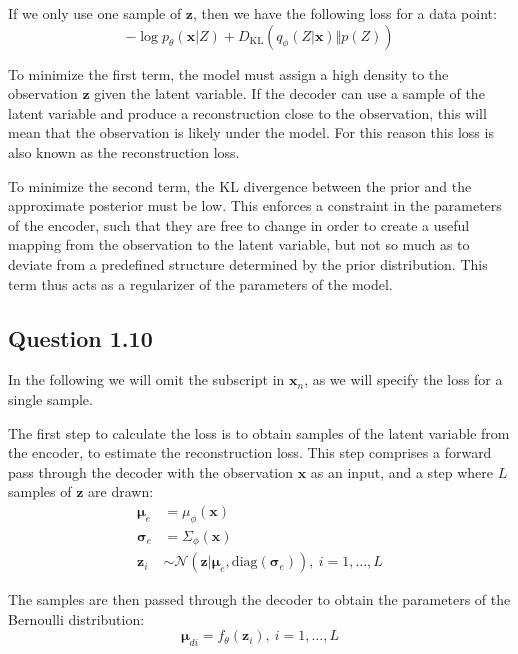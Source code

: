 \documentclass{article}
\begin{document}
If we only use one sample of $\mathbf{z}$, then we have the following loss for a data point: 
\begin{equation*}
-\log p_\theta(\mathbf{x}\vert Z) + D_{\text{KL}}(q_\phi(Z\vert\mathbf{x})\Vert p(Z))
\end{equation*}

To minimize the first term, the model must assign a high density to the observation $\mathbf{z}$ given the latent variable. If the decoder can use a sample of the latent variable and produce a reconstruction close to the observation, this will mean that the observation is likely under the model. For this reason this loss is also known as the reconstruction loss.

To minimize the second term, the KL divergence between the prior and the approximate posterior must be low. This enforces a constraint in the parameters of the encoder, such that they are free to change in order to create a useful mapping from the observation to the latent variable, but not so much as to deviate from a predefined structure determined by the prior distribution. This term thus acts as a regularizer of the parameters of the model.

\subsection*{Question 1.10}

In the following we will omit the subscript in $\mathbf{x}_n$, as we will specify the loss for a single sample.

The first step to calculate the loss is to obtain samples of the latent variable from the encoder, to estimate the reconstruction loss. This step comprises a forward pass through the decoder with the observation $\mathbf{x}$ as an input, and a step where $L$ samples of $\mathbf{z}$ are drawn:
\begin{align*}
\boldsymbol{\mu}_e &= \mu_\phi(\mathbf{x}) \\
\boldsymbol{\sigma}_e &= \Sigma_\phi(\mathbf{x}) \\
\mathbf{z}_i &\sim \mathcal{N}(\mathbf{z} \vert \boldsymbol{\mu}_e, \text{diag}(\boldsymbol{\sigma}_e)),\ i = 1, \dots, L
\end{align*}

The samples are then passed through the decoder to obtain the parameters of the Bernoulli distribution:
\begin{equation*}
\boldsymbol{\mu}_{di} = f_\theta(\mathbf{z}_i),\ i = 1, \dots, L
\end{equation*}
\end{document}
